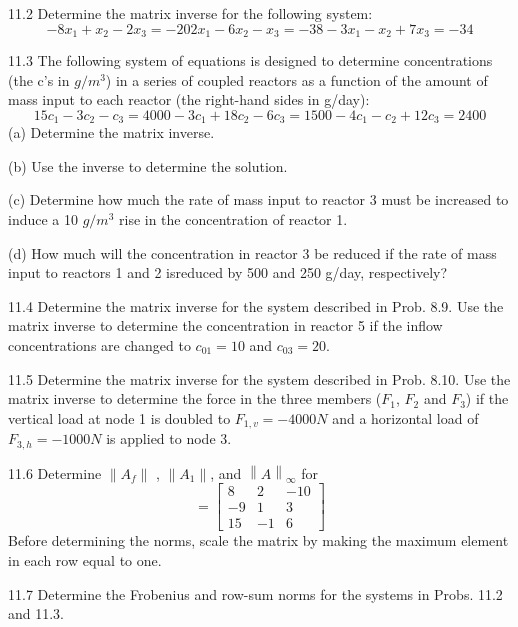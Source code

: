 \documentclass[../main.tex]{subfiles}
\begin{document}
11.2 Determine the matrix inverse for the following system:
\begin{equation}
-8x_{1} + x_{2} - 2x_{3} = -20
2x_{1} - 6x_{2} - x_{3} = -38
-3x_{1} - x_{2} + 7x_{3} = -34
\end{equation}


11.3 The following system of equations is designed to
determine concentrations (the c's in $g/m^{3}$) in a series of
coupled reactors as a function of the amount of mass input to
each reactor (the right-hand sides in g/day):
\begin{equation}
15c_{1} - 3c_{2} - c_{3} = 4000
-3c_{1} + 18c_{2} - 6c_{3} = 1500
-4c_{1} - c_{2} + 12c_{3} = 2400
\end{equation}
(a) Determine the matrix inverse.

(b) Use the inverse to determine the solution.

(c) Determine how much the rate of mass input to reactor 3
must be increased to induce a 10 $g/m^{3}$ rise in the concentration of reactor 1.

(d) How much will the concentration in reactor 3 be reduced if the rate of mass input to reactors 1 and 2 isreduced by 500 and 250 g/day, respectively?


11.4 Determine the matrix inverse for the system described
in Prob. 8.9. Use the matrix inverse to determine the
concentration in reactor 5 if the inflow concentrations are
changed to $c_{01} = 10$ and $c_{03} = 20$.


11.5 Determine the matrix inverse for the system described
in Prob. 8.10. Use the matrix inverse to determine the force
in the three members ($F_{1}$, $F_{2}$ and $F_{3}$) if the vertical load at
node 1 is doubled to $F_{1,v} = -4000 N$ and a horizontal load
of $F_{3,h} = -1000 N$ is applied to node 3.


11.6 Determine $\left \|A_{f}\right \|$ , $\left \|A_{1}\right \|$, and $\left \|A\right \|_{\infty}$ for
\begin{equation}
[A]=
\begin{bmatrix}
8& 2& -10\\
-9&1& 3\\
15& -1& 6
\end{bmatrix}
\end{equation}
Before determining the norms, scale the matrix by making
the maximum element in each row equal to one.


11.7 Determine the Frobenius and row-sum norms for the
systems in Probs. 11.2 and 11.3.
\end{document}
